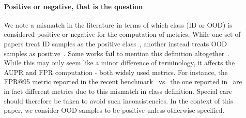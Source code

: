 \documentclass[10pt,twocolumn,letterpaper]{article}
\begin{document}
\paragraph{Positive or negative, that is the question} We note a mismatch in the literature in terms of which class (ID or OOD) is considered positive or negative for the computation of metrics. While one set of papers treat ID samples as the positive class~\cite{baseline-ood-2017,odin-2018,confidence-calib-class-ood-2018,openood-benchmark-2022}, another instead treats OOD samples as positive~\cite{ss-learning-ood-2020,mos-ood-2021,vim-ood-2022}. Some works fail to mention this definition altogether~\cite{sngp-2020}. While this may only seem like a minor difference of terminology, it affects the AUPR and FPR computation - both widely used metrics. For instance, the FPR@95 metric reported in the recent benchmark~\cite{openood-benchmark-2022} vs.~the one reported in~\cite{vim-ood-2022} are in fact different metrics due to this mismatch in class definition. Special care should therefore be taken to avoid such inconsistencies. In the context of this paper, we consider OOD samples to be positive unless otherwise specified.
\end{document}
